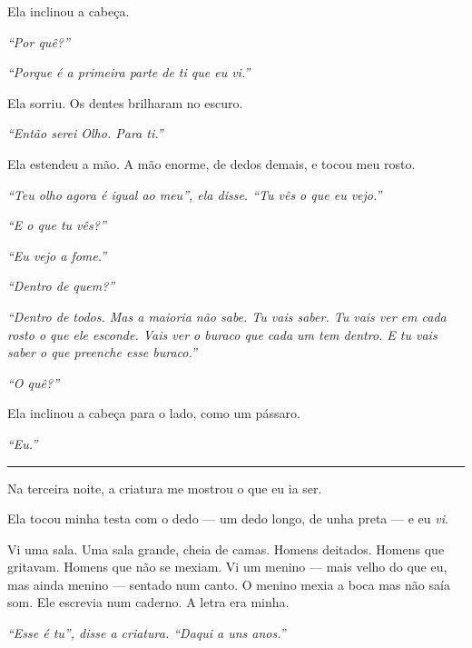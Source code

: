\noindent Ela inclinou a cabeça.

\noindent \textit{\textquotedblleft{}Por quê?\textquotedblright{}}

\noindent \textit{\textquotedblleft{}Porque é a primeira parte de ti que eu vi.\textquotedblright{}}

\noindent Ela sorriu. Os dentes brilharam no escuro.

\noindent \textit{\textquotedblleft{}Então serei Olho. Para ti.\textquotedblright{}}

\noindent Ela estendeu a mão. A mão enorme, de dedos demais, e tocou meu rosto.

\noindent \textit{\textquotedblleft{}Teu olho agora é igual ao meu\textquotedblright{}\textit{, ela disse. }\textquotedblleft{}Tu vês o que eu vejo.\textquotedblright{}}

\noindent \textit{\textquotedblleft{}E o que tu vês?\textquotedblright{}}

\noindent \textit{\textquotedblleft{}Eu vejo a fome.\textquotedblright{}}

\noindent \textit{\textquotedblleft{}Dentro de quem?\textquotedblright{}}

\noindent \textit{\textquotedblleft{}Dentro de todos. Mas a maioria não sabe. Tu vais saber. Tu vais ver em cada rosto o que ele esconde. Vais ver o buraco que cada um tem dentro. E tu vais saber o que preenche esse buraco.\textquotedblright{}}

\noindent \textit{\textquotedblleft{}O quê?\textquotedblright{}}

\noindent Ela inclinou a cabeça para o lado, como um pássaro.

\noindent \textit{\textquotedblleft{}Eu.\textquotedblright{}}

\vspace{0.5em}\noindent\rule{\textwidth}{0.5pt}\vspace{0.5em}

\noindent Na terceira noite, a criatura me mostrou o que eu ia ser.

\noindent Ela tocou minha testa com o dedo --- um dedo longo, de unha preta --- e eu \textit{vi}.

\noindent Vi uma sala. Uma sala grande, cheia de camas. Homens deitados. Homens que gritavam. Homens que não se mexiam. Vi um menino --- mais velho do que eu, mas ainda menino --- sentado num canto. O menino mexia a boca mas não saía som. Ele escrevia num caderno. A letra era minha.

\noindent \textit{\textquotedblleft{}Esse é tu\textquotedblright{}\textit{, disse a criatura. }\textquotedblleft{}Daqui a uns anos.\textquotedblright{}}

